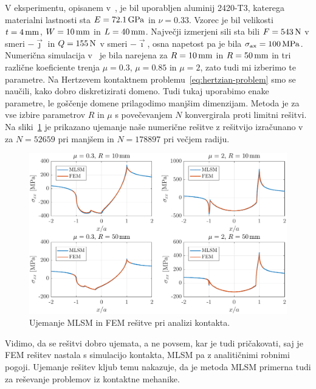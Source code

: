 \documentclass[12pt,a4paper,twoside]{article}
\theoremstyle{definition} %
\theoremstyle{plain} %
\numberwithin{equation}{section}
\newcommand{\vi}{\vec{\imath}}
\newcommand{\vj}{\vec{\jmath}}
\newcommand{\sax}{\ensuremath{\sigma_{\text{ax}}}}
\begin{document}
V eksperimentu, opisanem v~\cite{hojjati2014prediction}, je bil uporabljen aluminij 2420-T3, katerega
materialni lastnosti sta  $E = \unit[72.1]{GPa}$ in $\nu = 0.33$. Vzorec je bil velikosti $t =
\unit[4]{mm}$, $W = \unit[10]{mm}$ in $L = \unit[40]{mm}$. Največji izmerjeni sili sta bili $F =
\unit[543]{N}$ v smeri $-\vj$ in $Q = \unit[155]{N}$ v smeri $-\vi$, osna napetost pa je bila $\sax
= \unit[100]{MPa}$. Numerična simulacija v~\cite{pereira2016convergence} je bila narejena za $R =
\unit[10]{mm}$ in $R = \unit[50]{mm}$ in tri različne koeficiente trenja $\mu = 0.3$, $\mu = 0.85$
in $\mu = 2$, zato tudi mi izberimo te parametre. Na Hertzevem kontaktnem
problemu~\eqref{eq:hertzian-problem} smo se naučili, kako dobro diskretizirati domeno. Tudi tukaj
uporabimo enake parametre, le goščenje domene prilagodimo manjšim dimenzijam. Metoda je za vse
izbire parametrov $R$ in $\mu$ s povečevanjem $N$ konvergirala proti limitni rešitvi. Na
sliki~\ref{fig:fwo-ujemanje} je prikazano ujemanje naše numerične rešitve z rešitvijo izračunano
v~\cite{pereira2016convergence} za $N = 52659$ pri manjšem in $N = 178897$ pri večjem radiju.

\begin{figure}[h]
  \centering
  \includegraphics[width=\textwidth]{images/fwo_cases.pdf}
  \caption{Ujemanje MLSM in FEM rešitve pri analizi kontakta.}
  \label{fig:fwo-ujemanje}
\end{figure}

Vidimo, da se rešitvi dobro ujemata, a ne povsem, kar je tudi pričakovati, saj je FEM rešitev
nastala s simulacijo kontakta, MLSM pa z analitičnimi robnimi pogoji. Ujemanje rešitev kljub temu
nakazuje, da je metoda MLSM primerna tudi za reševanje problemov iz kontaktne mehanike.
\end{document}
